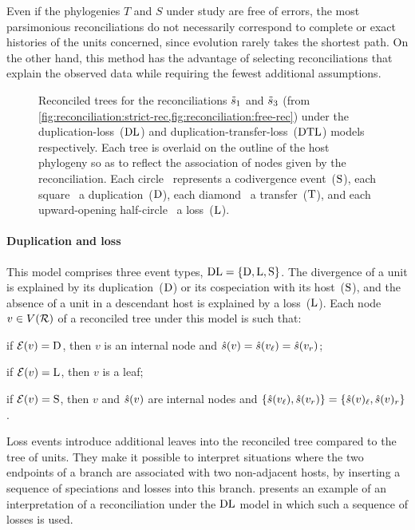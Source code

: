 Even if the phylogenies \(T\) and \(S\) under study are free of errors, the most parsimonious reconciliations do not necessarily correspond to complete or exact histories of the units concerned, since evolution rarely takes the shortest path.
On the other hand, this method has the advantage of selecting reconciliations that explain the observed data while requiring the fewest additional assumptions.

\begin{figure}[htb]
    \capstart
    \centering
    
    \caption[Two examples of reconciled trees]{
        Reconciled trees for the reconciliations \(\tilde{s}_1\) and \(\tilde{s}_3\) (from \cref{fig:reconciliation:strict-rec,fig:reconciliation:free-rec}) under the duplication-loss~(\(\mathrm{D}\mathrm{L}\)) and duplication-transfer-loss~(\(\mathrm{D}\mathrm{T}\mathrm{L}\)) models respectively.
        Each tree is overlaid on the outline of the host phylogeny so as to reflect the association of nodes given by the reconciliation.
        Each circle~{\showspeciation} represents a codivergence event~(\(\mathrm{S}\)),
        each square~{\showduplication} a duplication~(\(\mathrm{D}\)),
        each diamond~{\showtransfer} a transfer~(\(\mathrm{T}\)),
        and each upward-opening half-circle~{\showloss} a loss~(\(\mathrm{L}\)).
    }
    \label{fig:reconciliation:rec-trees}
\end{figure}

\paragraph{Duplication and loss~\textup{\parencite{Goodman1979FittingGeneLineage,Page1994MapsTreesCladistic}}}
This model comprises three event types, \(\mathrm{D}\mathrm{L} = \{\mathrm{D}, \mathrm{L}, \mathrm{S}\}\).
The divergence of a unit is explained by its duplication~(\(\mathrm{D}\)) or its cospeciation with its host~(\(\mathrm{S}\)), and the absence of a unit in a descendant host is explained by a loss~(\(\mathrm{L}\)).
Each node \(v \in V(\mathcal{R})\) of a reconciled tree under this model is such that:
\begin{compactitemize}
\item if \(\mathcal{E}(v) = \mathrm{D}\), then \(v\) is an internal node and \(\hat{s}(v) = \hat{s}(v_\mathit{\ell}) = \hat{s}(v_r)\);
    \item if \(\mathcal{E}(v) = \mathrm{L}\), then \(v\) is a leaf;
    \item if \(\mathcal{E}(v) = \mathrm{S}\), then \(v\) and \(\hat{s}(v)\) are internal nodes and \(\{\hat{s}(v_\mathit{\ell}), \hat{s}(v_r)\} = \{\hat{s}(v)_\mathit{\ell}, \hat{s}(v)_r\}\).
\end{compactitemize}
Loss events introduce additional leaves into the reconciled tree compared to the tree of units.
They make it possible to interpret situations where the two endpoints of a branch are associated with two non-adjacent hosts, by inserting a sequence of speciations and losses into this branch.
 presents an example of an interpretation of a reconciliation under the \(\mathrm{D}\mathrm{L}\) model in which such a sequence of losses is used.

